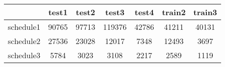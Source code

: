 \begin{tabular}{c|c|c|c|c|c|c}
&test1&test2&test3&test4&train2&train3\\\hline
schedule1&90765&97713&119376&42786&41211&40131\\
schedule2&27536&23028&12017&7348&12493&3697\\
schedule3&5784&3023&3108&2217&2589&1119\\
\end{tabular}